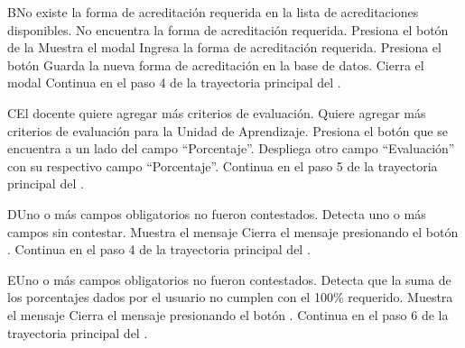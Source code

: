 
\begin{UCtrayectoriaA}{B}{No existe la forma de acreditación requerida en la lista de acreditaciones disponibles.}
    \UCpaso[\UCactor] No encuentra la forma de acreditación requerida.
    \UCpaso[\UCactor] Presiona el botón  de la 
    \UCpaso Muestra el modal 
    \UCpaso[\UCactor] Ingresa la forma de acreditación requerida.
    \UCpaso[\UCactor] Presiona el botón 
    \UCpaso Guarda la nueva forma de acreditación en la base de datos.
    \UCpaso Cierra el modal
    \UCpaso Continua en el paso 4 de la trayectoria principal del .
\end{UCtrayectoriaA}




\begin{UCtrayectoriaA}{C}{El docente quiere agregar más criterios de evaluación.}
	\UCpaso[\UCactor] Quiere agregar más criterios de evaluación para la Unidad de Aprendizaje.
	\UCpaso[\UCactor] Presiona el botón  que se encuentra a un lado del campo ``Porcentaje''.
	\UCpaso Despliega otro campo ``Evaluación'' con su respectivo campo ``Porcentaje''.
	\UCpaso Continua en el paso 5 de la trayectoria principal del .
\end{UCtrayectoriaA}



\begin{UCtrayectoriaA}{D}{Uno o más campos obligatorios no fueron contestados.}
	\UCpaso Detecta uno o más campos sin contestar.
    \UCpaso Muestra el mensaje 
    \UCpaso[\UCactor] Cierra el mensaje presionando el botón .
    \UCpaso Continua en el paso 4 de la trayectoria principal del .
\end{UCtrayectoriaA}



\begin{UCtrayectoriaA}{E}{Uno o más campos obligatorios no fueron contestados.}
	\UCpaso Detecta que la suma de los porcentajes dados por el usuario no cumplen con el 100\% requerido.
    \UCpaso Muestra el mensaje 
    \UCpaso[\UCactor] Cierra el mensaje presionando el botón .
    \UCpaso Continua en el paso 6 de la trayectoria principal del .
\end{UCtrayectoriaA}


